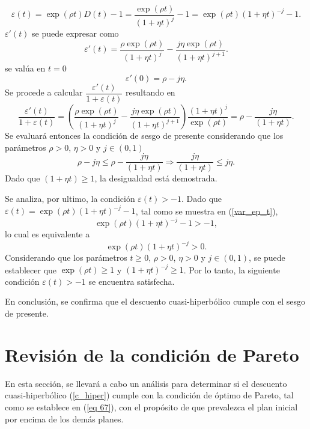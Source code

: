 \begin{equation}
    \label{var_ep_t}
    \varepsilon(t)=\exp(\rho t)D(t)-1=\dfrac{\exp(\rho t)}{(1+\eta t)^j}-1=\exp(\rho t)(1+\eta t)^{-j}-1.
\end{equation}
%
$\varepsilon'(t)$ se puede expresar como
\begin{equation}
    \label{deriv_var_ep_t}
    \varepsilon'(t)=\dfrac{\rho\exp(\rho t)}{(1+\eta t)^{j}}-\dfrac{j \eta \exp(\rho t) }{(1+\eta t)^{j+1}}.
\end{equation}
se valúa en $t=0$
\begin{equation}
    \label{deriv_var_ep_0}
\varepsilon'(0)=\rho-j \eta.
\end{equation}
Se procede a calcular $\dfrac{\varepsilon'(t)}{1+ \varepsilon(t)}$ resultando en
\begin{equation}
    \label{deriv_var_mu_t}
    \dfrac{\varepsilon'(t)}{1+ \varepsilon(t)}=\left(\dfrac{\rho\exp(\rho t)}{(1+\eta t)^{j}}-\dfrac{j \eta \exp(\rho t) }{(1+\eta t)^{j+1}} \right)\dfrac{(1+\eta t)^j}{\exp(\rho t)}=\rho - \dfrac{j \eta}{(1+\eta t)}.
    \end{equation}
Se evaluará entonces la condición de sesgo de presente considerando que los parámetros $\rho>0$, $\eta>0$ y $j \in (0,1)$ 
$$\rho-j \eta \leq \rho - \dfrac{j \eta}{(1+\eta t)}\Rightarrow \dfrac{j \eta}{(1+\eta t)} \leq j \eta.$$
Dado que $(1+\eta t) \geq 1$, la desigualdad está demostrada. 

Se analiza, por ultimo, la condición 
$\varepsilon(t)>-1$.
Dado que $\varepsilon(t)=\exp(\rho t)(1+\eta t)^{-j}-1$, tal como se muestra en (\ref{var_ep_t}),
%
$$\exp(\rho t)(1+\eta t)^{-j}-1>-1,$$
%
lo cual es equivalente a
%
$$\exp(\rho t)(1+\eta t)^{-j}>0.$$
%
Considerando que los parámetros $t\geq 0$, $\rho>0$, $\eta>0$ y $j\in (0,1)$, se puede establecer que $\exp(\rho t)\geq 1$ y $(1+\eta t)^{-j}\geq 1$. Por lo tanto, la siguiente condición $\varepsilon(t)>-1$ se encuentra satisfecha. 

En conclusión, se confirma que el descuento cuasi-hiperbólico cumple con el sesgo de presente.

\section{Revisión de la condición de Pareto}
En esta sección, se llevará a cabo un análisis para determinar si el descuento cuasi-hiperbólico (\ref{c_hiper}) cumple con la condición de óptimo de Pareto, tal como se establece en (\ref{eq 67}), con el propósito de que prevalezca el plan inicial por encima de los demás planes.

